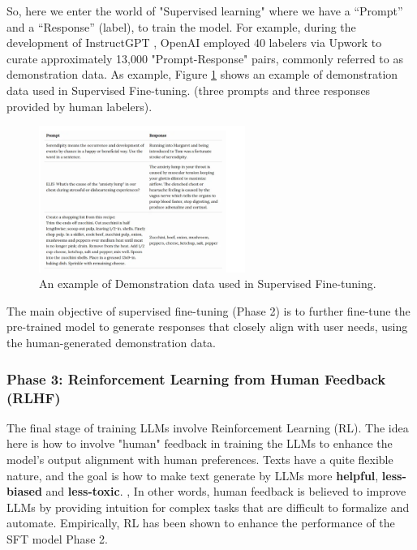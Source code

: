 So, here we enter the world of "Supervised learning" where we have a “Prompt” and a “Response” (label), 
to train the model. For example, during the development of InstructGPT \cite{ouyangTrainingLanguageModels2022}, 
OpenAI employed 40 labelers via Upwork to curate approximately 13,000 "Prompt-Response" pairs, 
commonly referred to as demonstration data. As example, Figure \ref{fig:demonstration-data} shows
an example of demonstration data used in Supervised Fine-tuning. (three prompts and three responses 
provided by human labelers).


\begin{figure}[h]
    \centering
    \includegraphics[width=0.6\textwidth]{./figures/dmonstartondata.png}
    \caption{An example of Demonstration data used in Supervised Fine-tuning.}
    \label{fig:demonstration-data}
\end{figure}

The main objective of supervised fine-tuning (Phase 2) is to further fine-tune the pre-trained model 
to generate responses that closely align with user needs, using the human-generated demonstration data.

\subsubsection{Phase 3: Reinforcement Learning from Human Feedback (RLHF)} \label{subsubsec:rlhf}

The final stage of training LLMs involve Reinforcement Learning (RL). 
The idea here is how to involve "human" feedback in training the LLMs to enhance the model's 
output alignment with human preferences. Texts have a quite flexible nature, 
and the goal is how to make text generate by LLMs more
\textbf{helpful}, \textbf{less-biased} and \textbf{less-toxic}. 
\cite{ouyangTrainingLanguageModels2022}, 
In other words, human feedback is believed to improve LLMs by providing intuition 
for complex tasks that are difficult to formalize and automate. Empirically, 
RL has been shown to enhance the performance of the SFT model Phase 2. 

